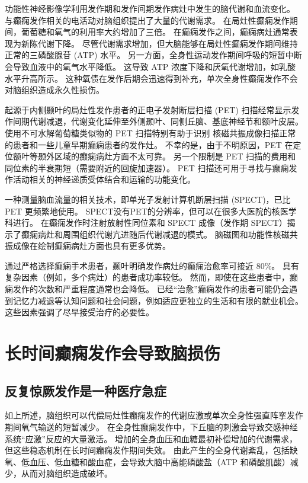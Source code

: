 功能性神经影像学利用发作期和发作间期发作病灶中发生的脑代谢和血流变化。
与癫痫发作相关的电活动对脑组织提出了大量的代谢需求。
在局灶性癫痫发作期间，葡萄糖和氧气的利用率大约增加了三倍。
在癫痫发作之间，癫痫病灶通常表现为新陈代谢下降。
尽管代谢需求增加，但大脑能够在局灶性癫痫发作期间维持正常的三磷酸腺苷 (ATP) 水平。
另一方面，全身性运动发作期间呼吸的短暂中断会导致血液中的氧气水平降低。
这导致 ATP 浓度下降和厌氧代谢增加，如乳酸水平升高所示。
这种氧债在发作后期会迅速得到补充，单次全身性癫痫发作不会对脑组织造成永久性损伤。


起源于内侧颞叶的局灶性发作患者的正电子发射断层扫描 (PET) 扫描经常显示发作间期代谢减退，代谢变化延伸至外侧颞叶、同侧丘脑、基底神经节和额叶皮层。
使用不可水解葡萄糖类似物的 PET 扫描特别有助于识别 核磁共振成像扫描正常的患者和一些儿童早期癫痫患者的发作灶。
不幸的是，由于不明原因，PET 在定位额叶等颞外区域的癫痫病灶方面不太可靠。
另一个限制是 PET 扫描的费用和同位素的半衰期短（需要附近的回旋加速器）。
PET 扫描还可用于寻找与癫痫发作活动相关的神经递质受体结合和运输的功能变化。


一种测量脑血流量的相关技术，即单光子发射计算机断层扫描 (SPECT)，已比 PET 更频繁地使用。
SPECT没有PET的分辨率，但可以在很多大医院的核医学科进行。
在癫痫发作时注射放射性同位素和 SPECT 成像（发作期 SPECT）揭示了癫痫病灶和周围组织代谢亢进随后代谢减退的模式。
脑磁图和功能性核磁共振成像在绘制癫痫病灶方面也具有更多优势。


通过严格选择癫痫手术患者，颞叶明确发作病灶的癫痫治愈率可接近 80\%。
具有复杂因素（例如，多个病灶）的患者成功率较低。
然而，即使在这些患者中，癫痫发作的次数和严重程度通常也会降低。
已经“治愈”癫痫发作的患者可能仍会遇到记忆力减退等认知问题和社会问题，例如适应更独立的生活和有限的就业机会。
这些因素强调了尽早接受治疗的必要性。



\section{长时间癫痫发作会导致脑损伤}

\subsection{反复惊厥发作是一种医疗急症}

如上所述，脑组织可以代偿局灶性癫痫发作的代谢应激或单次全身性强直阵挛发作期间氧气输送的短暂减少。
在全身性癫痫发作中，下丘脑的刺激会导致交感神经系统“应激”反应的大量激活。
增加的全身血压和血糖最初补偿增加的代谢需求，但这些稳态机制在长时间癫痫发作期间失效。
由此产生的全身代谢紊乱，包括缺氧、低血压、低血糖和酸血症，会导致大脑中高能磷酸盐（ATP 和磷酸肌酸）减少，从而对脑组织造成破坏。


